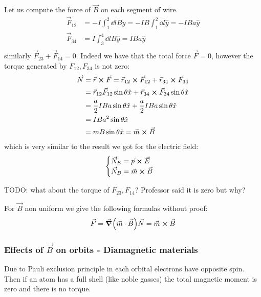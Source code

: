 \documentclass[12pt]{extarticle}
\begin{document}
Let us compute the force of $\vec B$ on each segment of wire.
\begin{align}
    \vec F_{12} & = -I \int_1^2 \dd l B \hat y = -I B \int_1^2 \dd l \hat y = - I B a \hat y \\
    \vec F_{34} & = I \int_3^4 \dd l B \hat y =  I B a \hat y                                \\
\end{align}
similarly $\vec F_{23} + \vec F_{14} = 0$.
Indeed we have that the total force $\vec F = 0$, however the torque generated by $F_{12}, F_{34}$ is not zero:
\begin{align}
    \vec N & = \vec r \cross \vec F = \vec r_{12} \cross \vec F_{12} + \vec r_{34} \cross \vec F_{34}        \\
           & = \vec r_{12} \vec F_{12} \sin \theta \hat x+ \vec r_{34} \cross \vec F_{34} \sin \theta \hat x \\
           & = \frac{a}{2} I B a \sin \theta \hat x + \frac{a}{2} I B a \sin \theta \hat x                   \\
           & = I B a^2 \sin \theta \hat x                                                                    \\
           & = m B \sin \theta \hat x = \vec m \cross \vec B
\end{align}
which is very similar to the result we got for the electric field:
\begin{equation}
    \begin{cases}
        \vec N_E = \vec p \cross \vec E \\
        \vec N_B = \vec m \cross \vec B
    \end{cases}
\end{equation}

TODO: what about the torque of $F_{23}, F_{14}$? Professor said it is zero but why?

For $\vec B$ non uniform we give the following formulas without proof:
\begin{equation}
    \vec F = \grad(\vec m \cdot \vec B)\\
    \vec N = \vec m \cross \vec B
\end{equation}

\subsubsection{Effects of \texorpdfstring{$\vec B$}{B} on orbits - Diamagnetic materials}

Due to Pauli exclusion principle in each orbital electrons have opposite spin.
Then if an atom has a full shell (like noble gasses) the total magnetic moment is zero and there is no torque.
\end{document}

